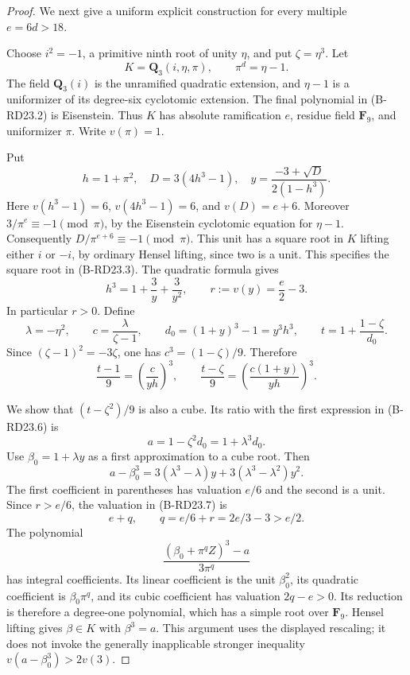 \begin{proof}
We next give a uniform explicit construction for every multiple
$e=6d>18$.

Choose $i^2=-1$, a primitive ninth root of unity $\eta$, and put
$\zeta=\eta^3$. Let
\[
 K=\mathbf Q_3(i,\eta,\pi),\qquad \pi^d=\eta-1.
                                                        \tag{B-RD23.2}
\]
The field $\mathbf Q_3(i)$ is the unramified quadratic extension,
and $\eta-1$ is a uniformizer of its degree-six cyclotomic
extension. The final polynomial in (B-RD23.2) is Eisenstein.
Thus $K$ has absolute ramification $e$, residue field $\mathbf F_9$,
and uniformizer $\pi$. Write $v(\pi)=1$.

Put
\[
 h=1+\pi^2,\quad D=3(4h^3-1),\quad
 y=\frac{-3+\sqrt D}{2(1-h^3)}.                         \tag{B-RD23.3}
\]
Here $v(h^3-1)=6$, $v(4h^3-1)=6$, and $v(D)=e+6$.
Moreover $3/\pi^e\equiv-1\pmod\pi$, by the Eisenstein
cyclotomic equation for $\eta-1$. Consequently
$D/\pi^{e+6}\equiv-1\pmod\pi$. This unit has a square root in
$K$ lifting either $i$ or $-i$, by ordinary Hensel lifting, since
two is a unit. This specifies the square root in (B-RD23.3).
The quadratic formula gives
\[
       h^3=1+\frac3y+\frac3{y^2},\qquad
       r:=v(y)=\frac e2-3.                             \tag{B-RD23.4}
\]
In particular $r>0$. Define
\[
 \lambda=-\eta^2,\qquad c=\frac{\lambda}{\zeta-1},\qquad
 d_0=(1+y)^3-1=y^3h^3,\qquad
 t=1+\frac{1-\zeta}{d_0}.                             \tag{B-RD23.5}
\]
Since $(\zeta-1)^2=-3\zeta$, one has
$c^3=(1-\zeta)/9$. Therefore
\[
 \frac{t-1}{9}=\left(\frac{c}{yh}\right)^3,
 \qquad
 \frac{t-\zeta}{9}
   =\left(\frac{c(1+y)}{yh}\right)^3.                 \tag{B-RD23.6}
\]

We show that $(t-\zeta^2)/9$ is also a cube. Its ratio with the
first expression in (B-RD23.6) is
\[
              a=1-\zeta^2d_0=1+\lambda^3d_0.
\]
Use $\beta_0=1+\lambda y$ as a first approximation to a cube root.
Then
\[
 a-\beta_0^3
      =3(\lambda^3-\lambda)y
                   +3(\lambda^3-\lambda^2)y^2.
                                                        \tag{B-RD23.7}
\]
The first coefficient in parentheses has valuation $e/6$ and the
second is a unit. Since $r>e/6$, the valuation in (B-RD23.7) is
\[
             e+q,\qquad q=e/6+r=2e/3-3>e/2.
\]
The polynomial
\[
       \frac{(\beta_0+\pi^q Z)^3-a}{3\pi^q}
\]
has integral coefficients. Its linear coefficient is the unit
$\beta_0^2$, its quadratic coefficient is $\beta_0\pi^q$, and
its cubic coefficient has valuation $2q-e>0$. Its reduction is
therefore a degree-one polynomial, which has a simple root over
$\mathbf F_9$. Hensel lifting gives $\beta\in K$ with
$\beta^3=a$. This argument uses the displayed rescaling; it does
not invoke the generally inapplicable stronger inequality
$v(a-\beta_0^3)>2v(3)$.


\end{proof}
